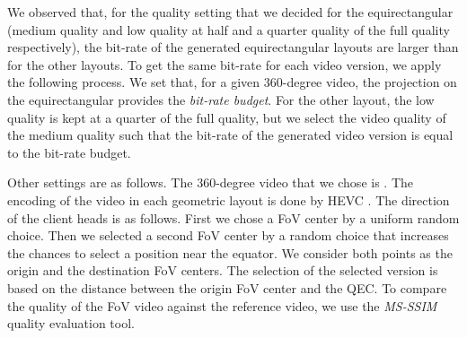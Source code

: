 We observed that, for the quality setting that we decided for the equirectangular (medium quality and 
low quality at half and a quarter quality of the full quality respectively), the bit-rate of the
generated equirectangular layouts are larger than for the other layouts. To get the
same bit-rate for each video version, we apply the following process. We set that, for a given 
360-degree video, the projection on the equirectangular provides the \emph{bit-rate budget}. For the
other layout, the low quality is kept at a quarter of the full quality, but we select the video quality of the medium quality such that the bit-rate of the generated video version is equal to the 
bit-rate budget.

Other settings are as follows. 
The 360-degree video that we chose is . The encoding of the video in each
geometric layout is done by HEVC . The direction of the client heads is as follows.
First we chose a \ac{FoV} center by a uniform random choice. Then we selected a second \ac{FoV} center
by a random choice that increases the chances to select a position near the equator. We consider
both points as the origin and the destination \ac{FoV} centers. The selection of the selected version
is based on the distance between the origin \ac{FoV} center and the \ac{QEC}. To compare the 
quality of the \ac{FoV} video against the reference video, we use the \emph{MS-SSIM} quality
evaluation tool.
